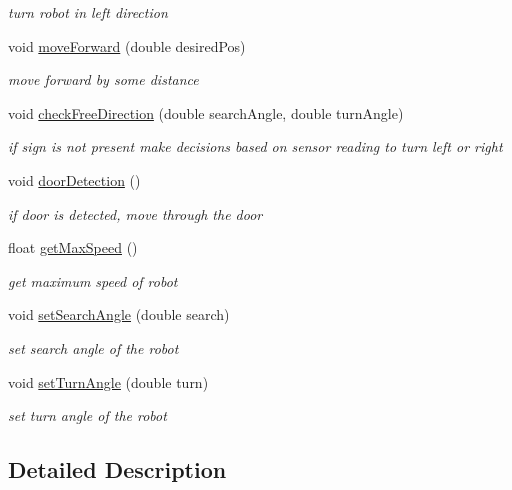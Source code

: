 \begin{DoxyCompactItemize}
\begin{DoxyCompactList}\small\item\em turn robot in left direction \end{DoxyCompactList}\item 
void \mbox{\hyperlink{class_bot_abc25556b72a44e45056d161eaa48e1c6}{move\+Forward}} (double desired\+Pos)
\begin{DoxyCompactList}\small\item\em move forward by some distance \end{DoxyCompactList}\item 
void \mbox{\hyperlink{class_bot_a057a268f423e1d8aa71f01ff4bf23149}{check\+Free\+Direction}} (double search\+Angle, double turn\+Angle)
\begin{DoxyCompactList}\small\item\em if sign is not present make decisions based on sensor reading to turn left or right \end{DoxyCompactList}\item 
void \mbox{\hyperlink{class_bot_a308e7e40f00a853d1397cfafcb7d2cd5}{door\+Detection}} ()
\begin{DoxyCompactList}\small\item\em if door is detected, move through the door \end{DoxyCompactList}\item 
float \mbox{\hyperlink{class_bot_a4a3b192232d8b938f11c1d253795c222}{get\+Max\+Speed}} ()
\begin{DoxyCompactList}\small\item\em get maximum speed of robot \end{DoxyCompactList}\item 
void \mbox{\hyperlink{class_bot_ab2b0ed8f324e0ed8777b0ed82bd5a718}{set\+Search\+Angle}} (double search)
\begin{DoxyCompactList}\small\item\em set search angle of the robot \end{DoxyCompactList}\item 
void \mbox{\hyperlink{class_bot_a1df4f3955f1e3dfae7aba746c852945c}{set\+Turn\+Angle}} (double turn)
\begin{DoxyCompactList}\small\item\em set turn angle of the robot \end{DoxyCompactList}\end{DoxyCompactItemize}


\subsection{Detailed Description}


